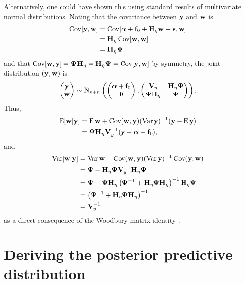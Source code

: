 Alternatively, one could have shown this using standard results of multivariate normal distributions.
Noting that the covariance between $\by$ and $\bw$ is  %
\begin{align*}
  \Cov[\by,\bw] 
  &= \Cov[\balpha + \bff_0 + \bH_\eta\bw + \bepsilon, \bw] \\
  &= \bH_\eta\Cov[\bw,\bw] \\
  &= \bH_\eta\bPsi 
\end{align*}
and that $\Cov[\bw,\by] = \bPsi\bH_\eta = \bH_\eta\bPsi = \Cov[\by,\bw]$ by symmetry, the joint distribution $(\by,\bw)$ is
\[
  \begin{pmatrix}
    \by \\
    \bw
  \end{pmatrix}
  \sim \N_{n+n}
  \left(
    \begin{pmatrix}
      \balpha + \bff_0 \\
      \bzero
    \end{pmatrix},
    \begin{pmatrix}
      \bV_y         & \bH_\eta\bPsi \\
      \bPsi\bH_\eta & \bPsi \\
    \end{pmatrix}
  \right).
\] 
Thus,
\begin{align*}
  \E [\bw|\by] 
  &= \E \bw + \Cov(\bw,\by) (\Var \by)^{-1} (\by - \E \by) \\
  &= \bPsi\bH_\eta\bV_y^{-1}(\by - \balpha - \bff_0),
\end{align*}
and
\begin{align*}
  \Var [\bw|\by] 
  &= \Var \bw - \Cov(\bw,\by) (\Var \by)^{-1} \Cov(\by,\bw) \\
  &= \bPsi - \bH_\eta\bPsi\bV_y^{-1}\bH_\eta\bPsi \\
  &= \bPsi - \bPsi\bH_\eta \left(\bPsi^{-1} + \bH_\eta\bPsi\bH_\eta \right)^{-1}\bH_\eta\bPsi  \\
  &= \left(\bPsi^{-1} + \bH_\eta\bPsi\bH_\eta \right)^{-1} \\
  &= \bV_y^{-1}
\end{align*}
as a direct consequence of the Woodbury matrix identity \citep[eq. 156, sec. 3.2.2]{petersen2008matrix}.

\section{Deriving the posterior predictive distribution}
\label{apx:postpred}

